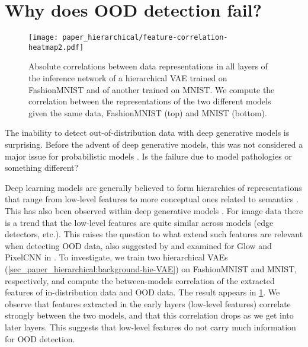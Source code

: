 {\section{Why does OOD detection fail?}\label{sec_paper_hierarchical:why-does-ood-fail}
\begin{figure}[t]
    \centering
    \texttt{[image: paper\_hierarchical/feature-correlation-heatmap2.pdf]}
    \vspace{0mm}
    \caption[Absolute correlations between data representations in all layers of the inference network of a hierarchical VAE trained on FashionMNIST and of another trained on MNIST.]{
    Absolute correlations between data representations in all layers of the inference network of a hierarchical VAE trained on FashionMNIST and of another trained on MNIST.
    We compute the correlation between the representations of the two different models given the same data, FashionMNIST (top) and MNIST (bottom).
    }
    \vspace{0mm}
    \label{fig_hierarchical:correlations-heatmap}
\end{figure}

The inability to detect out-of-distribution data with deep generative models is surprising.
Before the advent of deep generative models, this was not considered a major issue for probabilistic models \parencite{bishop_novelty_1994}.
Is the failure due to model pathologies or something different?

Deep learning models are generally believed to form hierarchies of representations that range from low-level features to more conceptual ones related to semantics \parencite{bengio_representation_2013}.
This has also been observed within deep generative models \parencite{maaloe_biva_2019, child_very_2021}.
For image data there is a trend that the low-level features are quite similar across models (edge detectors, etc.). This raises the question to what extend such features are relevant when detecting OOD data, also suggested  by \parencite{nalisnick_deep_2019} and examined for Glow and PixelCNN in \parencite{schirrmeister_understanding_2020}.
To investigate, we train two hierarchical VAEs (\cref{sec_paper_hierarchical:background-hie-VAE}) on FashionMNIST and MNIST, respectively, and compute the between-models correlation of the extracted features of in-distribution data and OOD data.
The result appears in \cref{fig_hierarchical:correlations-heatmap}.
We observe that features extracted in the early layers (low-level features) correlate strongly between the two models, and that this correlation drops as we get into later layers.
This suggests that low-level features do not carry much information for OOD detection.

}
